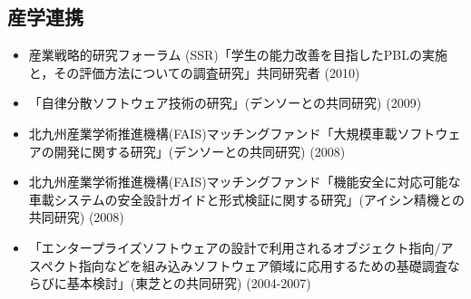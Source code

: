 \documentclass{jarticle}
\begin{document}
\subsection{産学連携}

\begin{itemize}
\item 産業戦略的研究フォーラム (SSR)「学生の能力改善を目指したPBLの実施と，その評価方法についての調査研究」共同研究者 (2010)

\item 「自律分散ソフトウェア技術の研究」(デンソーとの共同研究) (2009)

\item 北九州産業学術推進機構(FAIS)マッチングファンド「大規模車載ソフトウェアの開発に関する研究」(デンソーとの共同研究) (2008)

\item 北九州産業学術推進機構(FAIS)マッチングファンド「機能安全に対応可能な車載システムの安全設計ガイドと形式検証に関する研究」(アイシン精機との共同研究) (2008)

\item 「エンタープライズソフトウェアの設計で利用されるオブジェクト指向/アスペクト指向などを組み込みソフトウェア領域に応用するための基礎調査ならびに基本検討」(東芝との共同研究) (2004-2007)
\end{itemize}
\end{document}
